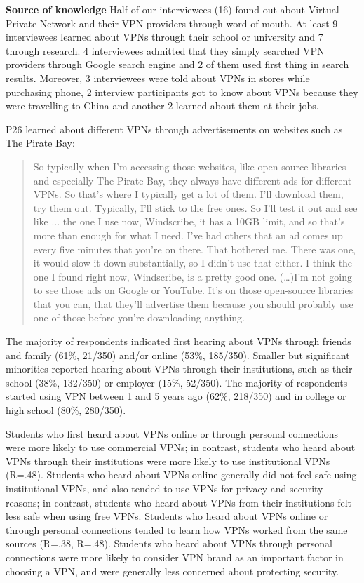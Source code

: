 \textbf{Source of knowledge} Half of our interviewees (16) found out about
Virtual Private Network and their VPN providers through word of mouth. At
least 9 interviewees learned about VPNs through their school or university and
7 through research. 4 interviewees admitted that they simply searched VPN
providers through Google search engine and 2 of them used first thing in
search results. Moreover, 3 interviewees were told about VPNs in stores while
purchasing phone, 2 interview participants got to know about VPNs because they
were travelling to China and another 2 learned about them at their jobs.


P26 learned about different VPNs through advertisements on websites such as
The Pirate Bay: \begin{quote}So typically when I'm accessing those websites,
    like open-source libraries and especially The Pirate Bay, they always have
    different ads for different VPNs. So that's where I typically get a lot of
    them. I'll download them, try them out. Typically, I'll stick to the free
    ones. So I'll test it out and see like ... the one I use now, Windscribe,
    it has a 10GB limit, and so that's more than enough for what I need. I've
    had others that an ad comes up every five minutes that you're on there.
    That bothered me. There was one, it would slow it down substantially, so I
    didn't use that either. I think the one I found right now, Windscribe, is
    a pretty good one.  (\dots)I'm not going to see those ads on Google or
YouTube. It's on those open-source libraries that you can, that they'll
advertise them because you should probably use one of those before you're
downloading anything.\end{quote}

The majority of respondents indicated first hearing about VPNs through friends
and family (61\%, 21/350) and/or online (53\%, 185/350). Smaller but
significant minorities reported hearing about VPNs through their institutions,
such as their school (38\%, 132/350) or employer (15\%, 52/350). The majority
of respondents started using VPN between 1 and 5 years ago (62\%, 218/350) and
in college or high school (80\%, 280/350).

Students who first heard about VPNs online or through personal connections
were more likely to use commercial VPNs; in contrast, students who heard about
VPNs through their institutions were more likely to use institutional VPNs
(R=.48). Students who heard about VPNs online generally did not feel safe
using institutional VPNs, and also tended to use VPNs for privacy and security
reasons; in contrast, students who heard about VPNs from their institutions
felt less safe when using free VPNs. Students who heard about VPNs online or
through personal connections tended to learn how VPNs worked from the same
sources (R=.38, R=.48). Students who heard about VPNs through personal
connections were more likely to consider VPN brand as an important factor in
choosing a VPN, and were generally less concerned about protecting security.

